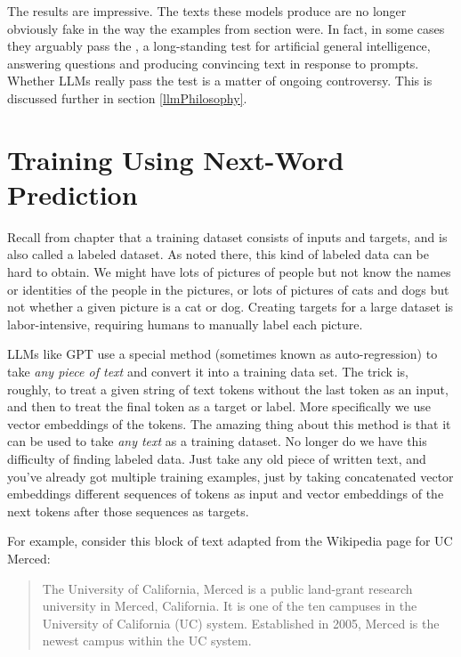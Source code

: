 The results are impressive. The texts these models produce are no longer obviously fake in the way the examples from section  were. In fact, in some cases they arguably pass the , a long-standing test for artificial general intelligence, answering questions and producing convincing  text in response to prompts. Whether LLMs really pass the test is a matter of ongoing controversy. This is discussed further in section \ref{llmPhilosophy}.

\section{Training Using Next-Word Prediction}

Recall from chapter  that a training dataset consists of inputs and targets, and is also called a labeled dataset. As noted there, this kind of labeled data can be hard to obtain. We might have lots of pictures of people but not know the names or identities of the people in the pictures, or lots of pictures of cats and dogs but not whether a given picture is a cat or dog. Creating targets for a large dataset is labor-intensive, requiring humans to manually label each picture.

LLMs like GPT use a special method (sometimes known as auto-regression) to take \emph{any piece of text} and convert it into a training data set. The trick is, roughly, to treat a given string of text tokens without the last token as an input, and then to treat the final token as a target or label. More specifically we use vector embeddings of the tokens. The amazing thing about this method is that it can be used to take \emph{any text} as a training dataset. No longer do we have this difficulty of finding labeled data. Just take any old piece of written text, and you've already got multiple training examples, just by taking concatenated vector embeddings different sequences of tokens as input and vector embeddings of the next tokens after those sequences as targets.

For example, consider this block of text adapted from the Wikipedia page for UC Merced:

\begin{quote}
The University of California, Merced is a public land-grant research university in Merced, California. It is one of the ten campuses in the University of California (UC) system. Established in 2005, Merced is the newest campus within the UC system.
\end{quote}

